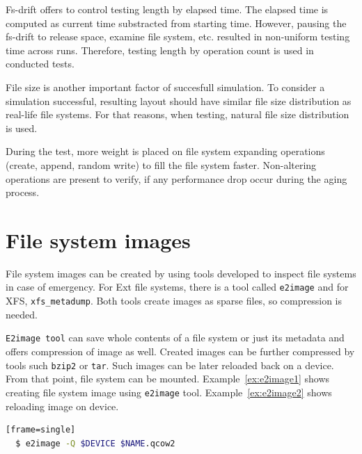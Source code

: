 \documentclass[
  color, %
  table, %
  lof,   %
  lot,   %
]{fithesis3}
\begin{document}
Fs-drift offers to control testing length by elapsed time. The elapsed time is computed as current time substracted from starting time. However, pausing the fs-drift to release space, examine file system, etc. resulted in non-uniform testing time across runs. Therefore, testing length by operation count is used in conducted tests.

File size is another important factor of succesfull simulation. To consider a simulation successful, resulting layout should have similar file size distribution as real-life file systems. For that reasons, when testing, natural file size distribution is used.\footnotemark[2] 


During the test, more weight is placed on file system expanding operations (create, append, random write) to fill the file system faster. Non-altering operations are present to verify, if any performance drop occur during the aging process.

\section{File system images}
File system images can be created by using tools developed to inspect file systems in case of emergency. For Ext file systems, there is a tool called \texttt{e2image} and for XFS, \texttt{xfs\_metadump}. Both tools create images as sparse files, so compression is needed.

\texttt{E2image tool} can save whole contents of a file system or just its metadata and offers compression of image as well. Created images can be further compressed by tools such \texttt{bzip2} or \texttt{tar}. Such images can be later reloaded back on a device. From that point, file system can be mounted. Example~\ref{ex:e2image1} shows creating file system image using \texttt{e2image} tool. Example~\ref{ex:e2image2} shows reloading image on device.


\begin{lstlisting}[language=bash, label={ex:e2image1}, caption={Creating compressed image using \texttt{e2image}.}][frame=single]
  $ e2image -Q $DEVICE $NAME.qcow2
\end{lstlisting}
\end{document}
